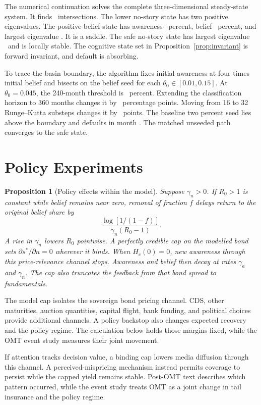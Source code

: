 \documentclass[11pt]{article}
\newtheorem{proposition}{Proposition}
\theoremstyle{definition}
\begin{document}
The numerical continuation solves the complete three-dimensional steady-state system. It finds \EquilibriumCount\ intersections. The lower no-story state has two positive eigenvalues. The positive-belief state has awareness \SaddleAwarePct\ percent, belief \SaddleBeliefPct\ percent, and largest eigenvalue \SaddleEigen. It is a saddle. The safe no-story state has largest eigenvalue \StableEigen\ and is locally stable. The cognitive state set in Proposition~\ref{prop:invariant} is forward invariant, and default is absorbing.

To trace the basin boundary, the algorithm fixes initial awareness at four times initial belief and bisects on the belief seed for each $\theta_0\in[0.01,0.15]$. At $\theta_0=0.045$, the 240-month threshold is \SeedThresholdPct\ percent. Extending the classification horizon to 360 months changes it by \SeedHorizonDiff\ percentage points. Moving from 16 to 32 Runge--Kutta substeps changes it by \SeedStepDiff\ points. The baseline two percent seed lies above the boundary and defaults in month \ZoneDefMonth. The matched unseeded path converges to the safe state.

\section{Policy Experiments}\label{sec:policy}

\begin{proposition}[Policy effects within the model]\label{prop:policy}
Suppose $\gamma_n>0$. If $R_0>1$ is constant while belief remains near zero, removal of fraction $f$ delays return to the original belief share by
\[
\frac{\log[1/(1-f)]}{\gamma_n(R_0-1)}.
\]
A rise in $\gamma_n$ lowers $R_0$ pointwise. A perfectly credible cap on the modelled bond sets $\partial s^*/\partial n=0$ wherever it binds. When $H_c(0)=0$, new awareness through this price-relevance channel stops. Awareness and belief then decay at rates $\gamma_a$ and $\gamma_n$. The cap also truncates the feedback from that bond spread to fundamentals.
\end{proposition}

The model cap isolates the sovereign bond pricing channel. CDS, other maturities, auction quantities, capital flight, bank funding, and political choices provide additional channels. A policy backstop also changes expected recovery and the policy regime. The calculation below holds those margins fixed, while the OMT event study measures their joint movement.

If attention tracks decision value, a binding cap lowers media diffusion through this channel. A perceived-mispricing mechanism instead permits coverage to persist while the capped yield remains stable. Post-OMT text describes which pattern occurred, while the event study treats OMT as a joint change in tail insurance and the policy regime.
\end{document}

